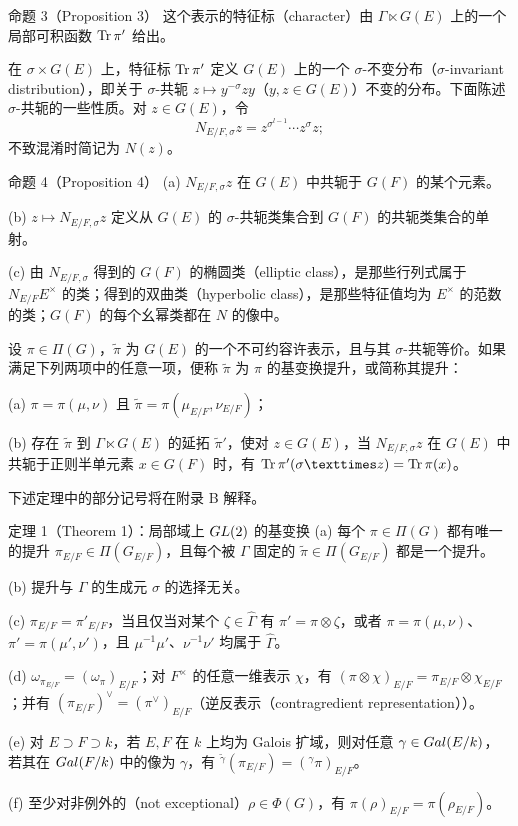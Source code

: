 \begin{originaltheorem}{命题 3（Proposition 3）}
这个表示的特征标（character）由 $\Gamma\ltimes G(E)$ 上的一个局部可积函数 $\operatorname{Tr}\pi'$ 给出。
\end{originaltheorem}

在 $\sigma\times G(E)$ 上，特征标 $\operatorname{Tr}\pi'$ 定义 $G(E)$ 上的一个 $\sigma$-不变分布（$\sigma$-invariant distribution），即关于 $\sigma$-共轭 $z\mapsto y^{-\sigma}zy$（$y,z\in G(E)$）不变的分布。下面陈述 $\sigma$-共轭的一些性质。对 $z\in G(E)$，令
\[
 N_{E/F,\sigma}z=z^{\sigma^{l-1}}\cdots z^\sigma z;
\]
不致混淆时简记为 $N(z)$。

\begin{originaltheorem}{命题 4（Proposition 4）}
(a) $N_{E/F,\sigma}z$ 在 $G(E)$ 中共轭于 $G(F)$ 的某个元素。

(b) $z\mapsto N_{E/F,\sigma}z$ 定义从 $G(E)$ 的 $\sigma$-共轭类集合到 $G(F)$ 的共轭类集合的单射。

(c) 由 $N_{E/F,\sigma}$ 得到的 $G(F)$ 的椭圆类（elliptic class），是那些行列式属于 $N_{E/F}E^\times$ 的类；得到的双曲类（hyperbolic class），是那些特征值均为 $E^\times$ 的范数的类；$G(F)$ 的每个幺幂类都在 $N$ 的像中。
\end{originaltheorem}

设 $\pi\in\Pi(G)$，$\widetilde\pi$ 为 $G(E)$ 的一个不可约容许表示，且与其 $\sigma$-共轭等价。如果满足下列两项中的任意一项，便称 $\widetilde\pi$ 为 $\pi$ 的基变换提升，或简称其提升：

(a) $\pi=\pi(\mu,\nu)$ 且 $\widetilde\pi=\pi(\mu_{E/F},\nu_{E/F})$；

(b) 存在 $\widetilde\pi$ 到 $\Gamma\ltimes G(E)$ 的延拓 $\widetilde\pi'$，使对 $z\in G(E)$，当 $N_{E/F,\sigma}z$ 在 $G(E)$ 中共轭于正则半单元素 $x\in G(F)$ 时，有 $\Tr\widetilde\pi'(\sigma\times z)=\Tr\pi(x)$。

下述定理中的部分记号将在附录 B 解释。

\begin{originaltheorem}{定理 1（Theorem 1）：局部域上 $GL(2)$ 的基变换}
(a) 每个 $\pi\in\Pi(G)$ 都有唯一的提升 $\pi_{E/F}\in\Pi(G_{E/F})$，且每个被 $\Gamma$ 固定的 $\widetilde\pi\in\Pi(G_{E/F})$ 都是一个提升。

(b) 提升与 $\Gamma$ 的生成元 $\sigma$ 的选择无关。

(c) $\pi_{E/F}=\pi'_{E/F}$，当且仅当对某个 $\zeta\in\widehat\Gamma$ 有 $\pi'=\pi\otimes\zeta$，或者 $\pi=\pi(\mu,\nu)$、$\pi'=\pi(\mu',\nu')$，且 $\mu^{-1}\mu'$、$\nu^{-1}\nu'$ 均属于 $\widehat\Gamma$。

(d) $\omega_{\pi_{E/F}}=(\omega_\pi)_{E/F}$；对 $F^\times$ 的任意一维表示 $\chi$，有 $(\pi\otimes\chi)_{E/F}=\pi_{E/F}\otimes\chi_{E/F}$；并有 $(\pi_{E/F})^\vee=(\pi^\vee)_{E/F}$（逆反表示（contragredient representation））。

(e) 对 $E\supset F\supset k$，若 $E,F$ 在 $k$ 上均为 Galois 扩域，则对任意 $\gamma\in Gal(E/k)$，若其在 $Gal(F/k)$ 中的像为 $\gamma$，有 ${}^{\widetilde\gamma}(\pi_{E/F})=({}^\gamma\pi)_{E/F}$。

(f) 至少对非例外的（not exceptional）$\rho\in\Phi(G)$，有 $\pi(\rho)_{E/F}=\pi(\rho_{E/F})$。
\end{originaltheorem}

